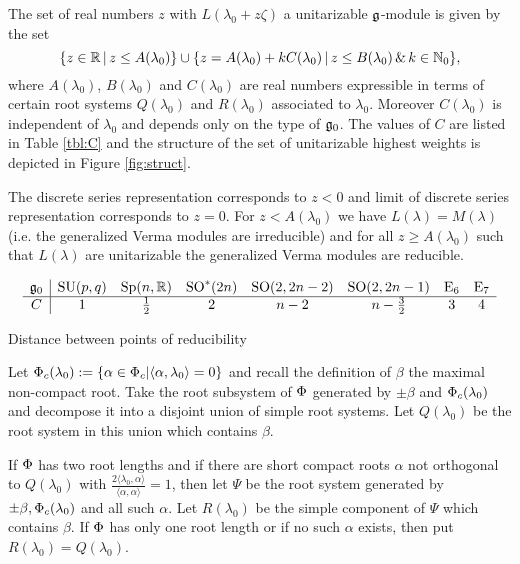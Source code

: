 \begin{theorem}
 The set of real numbers $z$ with $L(\lambda_0 + z\zeta)$ a unitarizable $\mathfrak{g}$-module is given by the set
\[
  \{z \in \mathbb{R}\, |\, z \leq A(\lambda_0)\} \cup \{ z=A(\lambda_0) + k C(\lambda_0)\,|\, z \leq B(\lambda_0) \,\&\, k\in \mathbb{N}_0\},
\]
where $A(\lambda_0)$, $B(\lambda_0)$ and $C(\lambda_0)$ are real numbers expressible in terms of certain root systems $Q(\lambda_0)$ and $R(\lambda_0)$ associated to $\lambda_0$. Moreover $C(\lambda_0)$ is independent of $\lambda_0$ and depends only on the type of $\mathfrak{g}_0$. The values of $C$ are listed in Table \ref{tbl:C} and the structure of the set of unitarizable highest weights is depicted in Figure \ref{fig:struct}.
	
The discrete series representation corresponds to $z <0$ and limit of discrete series representation corresponds to $z=0$. For $z  < A(\lambda_0)$ we have $L(\lambda) = M(\lambda)$ (i.e. the generalized Verma modules are irreducible) and for all $z \geq A(\lambda_0)$ such that $L(\lambda)$ are unitarizable the generalized Verma modules are reducible.%

\begin{table}[h]
\[\begin{array}{c|ccccccc}
\mathfrak{g}_0 & \mathrm{SU}(p,q) & \mathrm{Sp}(n,\mathbb{R}) & \mathrm{SO}^*(2n) & \mathrm{SO}(2,2n-2) & \mathrm{SO}(2,2n-1) & \mathrm{E}_6 & \mathrm{E}_7\\\hline
C & 1 & \frac{1}{2} & 2 & n-2 & n-\frac{3}{2} & 3 & 4
\end{array}\]\caption{Distance between points of reducibility}\label{tbl:C}
\end{table}
\end{theorem}

Let $\Phi_c(\lambda_0) := \{ \alpha \in \Phi_c | \langle \alpha,\lambda_0 \rangle = 0 \}$ and recall the definition of $\beta$ the maximal non-compact root. Take the root subsystem of $\Phi$ generated by $\pm \beta$ and $\Phi_c(\lambda_0)$ and decompose it into a disjoint union of simple root systems. Let $Q(\lambda_0)$ be the root system in this union which contains $\beta$.

If $\Phi$ has two root lengths and if there are short compact roots $\alpha$ not orthogonal to $Q(\lambda_0)$ with $\frac{2 \langle \lambda_0,\alpha \rangle}{\langle \alpha, \alpha \rangle}  =1$, then let $\Psi$ be the root system generated by $\pm \beta, \Phi_c(\lambda_0)$ and all such $\alpha$. Let $R(\lambda_0)$ be the simple component of $\Psi$ which contains $\beta$. If $\Phi$ has only one root length or if no such $\alpha$ exists, then put $R(\lambda_0) = Q(\lambda_0)$.


